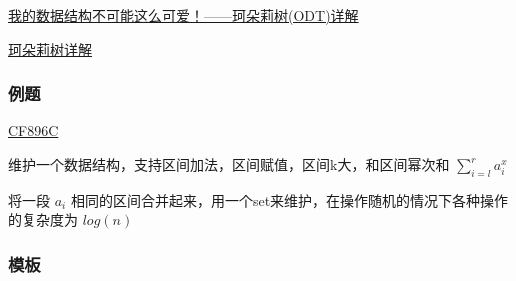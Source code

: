 \documentclass[
]{article}
\begin{document}
\href{https://www.cnblogs.com/lyp-Bird/p/10310609.html}{我的数据结构不可能这么可爱！------珂朵莉树(ODT)详解}

\href{https://www.cnblogs.com/yzhang-rp-inf/p/9443659.html}{珂朵莉树详解}

\hypertarget{ux4f8bux9898}{%
\subsubsection{例题}\label{ux4f8bux9898}}

\href{https://codeforces.com/problemset/problem/896/C}{CF896C}

维护一个数据结构，支持区间加法，区间赋值，区间k大，和区间幂次和
\(\sum_{i=l}^{r} {a_{i}^{x}}\)

将一段 \(a_{i}\)
相同的区间合并起来，用一个set来维护，在操作随机的情况下各种操作的复杂度为
\(log(n)\)

\hypertarget{ux6a21ux677f}{%
\subsubsection{模板}\label{ux6a21ux677f}}
\end{document}
